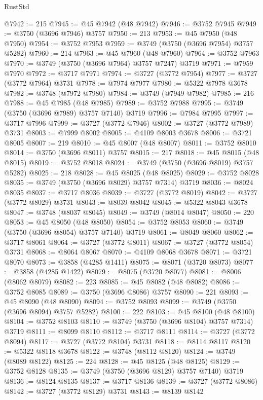 \begin{lexlean}{RustStd}
\begin{coremodule}
@7942 := 215
@7945 := @45 @7942 (@48 @7942)
@7946 := @3752 @7945
@7949 := @3750 (@3696 @7946) @3757
@7950 := 213
@7953 := @45 @7950 (@48 @7950)
@7954 := @3752 @7953
@7959 := @3749 (@3750 (@3696 @7954) @3757 @5282)
@7960 := 214
@7963 := @45 @7960 (@48 @7960)
@7964 := @3752 @7963
@7970 := @3749 (@3750 (@3696 @7964) @3757 @7247) @3719
@7971 := @7959 @7970
@7972 := @3717 @7971
@7974 := @3727 (@3772 @7954)
@7977 := @3727 (@3772 @7964) @3731
@7978 := @7974 @7977
@7980 := @5322 @7978 @3678
@7982 := @3748 (@7972 @7980)
@7984 := @3749 (@7949 @7982)
@7985 := 216
@7988 := @45 @7985 (@48 @7985)
@7989 := @3752 @7988
@7995 := @3749 (@3750 (@3696 @7989) @3757 @7140) @3719
@7996 := @7984 @7995
@7997 := @3717 @7996
@7999 := @3727 (@3772 @7946)
@8002 := @3727 (@3772 @7989) @3731
@8003 := @7999 @8002
@8005 := @4109 @8003 @3678
@8006 := @3721 @8005
@8007 := 219
@8010 := @45 @8007 (@48 @8007)
@8011 := @3752 @8010
@8014 := @3750 (@3696 @8011) @3757
@8015 := 217
@8018 := @45 @8015 (@48 @8015)
@8019 := @3752 @8018
@8024 := @3749 (@3750 (@3696 @8019) @3757 @5282)
@8025 := 218
@8028 := @45 @8025 (@48 @8025)
@8029 := @3752 @8028
@8035 := @3749 (@3750 (@3696 @8029) @3757 @7314) @3719
@8036 := @8024 @8035
@8037 := @3717 @8036
@8039 := @3727 (@3772 @8019)
@8042 := @3727 (@3772 @8029) @3731
@8043 := @8039 @8042
@8045 := @5322 @8043 @3678
@8047 := @3748 (@8037 @8045)
@8049 := @3749 (@8014 @8047)
@8050 := 220
@8053 := @45 @8050 (@48 @8050)
@8054 := @3752 @8053
@8060 := @3749 (@3750 (@3696 @8054) @3757 @7140) @3719
@8061 := @8049 @8060
@8062 := @3717 @8061
@8064 := @3727 (@3772 @8011)
@8067 := @3727 (@3772 @8054) @3731
@8068 := @8064 @8067
@8070 := @4109 @8068 @3678
@8071 := @3721 @8070
@8073 := @3858 (@4285 @1411)
@8075 := @8071 (@3720 @8073)
@8077 := @3858 (@4285 @1422)
@8079 := @8075 (@3720 @8077)
@8081 := @8006 (@8062 @8079)
@8082 := 223
@8085 := @45 @8082 (@48 @8082)
@8086 := @3752 @8085
@8089 := @3750 (@3696 @8086) @3757
@8090 := 221
@8093 := @45 @8090 (@48 @8090)
@8094 := @3752 @8093
@8099 := @3749 (@3750 (@3696 @8094) @3757 @5282)
@8100 := 222
@8103 := @45 @8100 (@48 @8100)
@8104 := @3752 @8103
@8110 := @3749 (@3750 (@3696 @8104) @3757 @7314) @3719
@8111 := @8099 @8110
@8112 := @3717 @8111
@8114 := @3727 (@3772 @8094)
@8117 := @3727 (@3772 @8104) @3731
@8118 := @8114 @8117
@8120 := @5322 @8118 @3678
@8122 := @3748 (@8112 @8120)
@8124 := @3749 (@8089 @8122)
@8125 := 224
@8128 := @45 @8125 (@48 @8125)
@8129 := @3752 @8128
@8135 := @3749 (@3750 (@3696 @8129) @3757 @7140) @3719
@8136 := @8124 @8135
@8137 := @3717 @8136
@8139 := @3727 (@3772 @8086)
@8142 := @3727 (@3772 @8129) @3731
@8143 := @8139 @8142

\end{coremodule}
\end{lexlean}
